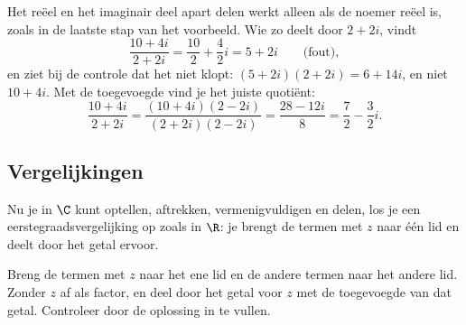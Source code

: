 Het reëel en het imaginair deel apart delen werkt alleen als de noemer reëel is, zoals in de laatste stap van het voorbeeld. Wie zo deelt door $2 + 2i$, vindt
\[ \frac{10 + 4i}{2 + 2i} = \frac{10}{2} + \frac{4}{2}i = 5 + 2i \qquad \text{(fout)} , \]
en ziet bij de controle dat het niet klopt: $(5 + 2i)(2 + 2i) = 6 + 14i$, en niet $10 + 4i$. Met de toegevoegde vind je het juiste quotiënt:
\[ \frac{10 + 4i}{2 + 2i} = \frac{(10 + 4i)(2 - 2i)}{(2 + 2i)(2 - 2i)} = \frac{28 - 12i}{8} = \frac72 - \frac32 i . \]

\begin{oefeningen}
\end{oefeningen}

\subsection{Vergelijkingen}

Nu je in $\C$ kunt optellen, aftrekken, vermenigvuldigen en delen, los je een eerstegraadsvergelijking op zoals in $\R$: je brengt de termen met $z$ naar één lid en deelt door het getal ervoor.


\begin{werkwijze}
Breng de termen met $z$ naar het ene lid en de andere termen naar het andere lid. Zonder $z$ af als factor, en deel door het getal voor $z$ met de toegevoegde van dat getal. Controleer door de oplossing in te vullen.
\end{werkwijze}

\begin{oefeningen}
\end{oefeningen}

\opdrachtenkop

